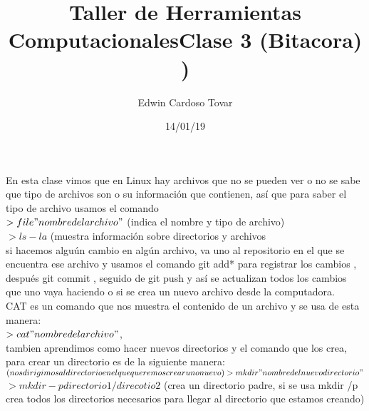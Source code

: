 \documentclass[letterpaper, 12pt, oneside]{article}%
\title{\Huge Taller de Herramientas Computacionales}
\author{Edwin Cardoso Tovar}%
\date{14/01/19}%
\begin{document}
	\maketitle
	\begin{center}%
	\end{center}%
	\newpage%
	
	\title{\textbf{\Huge Clase 3 (Bitacora)\\}) \\}%
	
	En esta clase vimos que en Linux hay archivos que no se pueden ver o no se sabe que tipo de archivos son o su información que contienen, así que para saber el tipo de archivo usamos el comando\\
	
	$>file "nombre del archivo"$	(indica el nombre y tipo de archivo)\\
	
	$>ls -la $ (muestra información sobre directorios y archivos\\
	
	si hacemos alguún cambio en algún archivo, va uno al repositorio en el que se encuentra ese archivo y usamos el comando git add* para registrar los cambios , después git commit , seguido de git push y así se actualizan todos los cambios que uno vaya haciendo o si se crea un nuevo archivo desde la computadora.\\
	
	CAT es un comando  que nos muestra el contenido de un archivo y se usa de esta manera:\\
	$>cat "nombre del archivo"$,\\
	tambien aprendimos como hacer nuevos directorios y el comando que los crea, para crear un directorio es de la siguiente manera:\\
	$(nos dirigimos al directorio en el que queremos crear uno nuevo)\\
	>mkdir "nombre del nuevo directorio"$\\
	$>mkdir -p directorio1/direcotio2$ (crea un directorio padre, si se usa mkdir /p crea todos los directorios necesarios para llegar al directorio que estamos creando)\\
	
\end{document}
